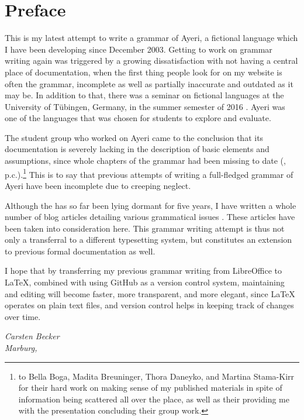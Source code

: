\chapter*{Preface}

This is my latest attempt to write a grammar of Ayeri, a fictional language 
which I have been developing since December 2003. Getting to work on grammar 
writing again was triggered by a growing dissatisfaction with not having a 
central place of documentation, when the first thing people look for on my 
website is often the grammar, incomplete as well as partially inaccurate and 
outdated as it may be. In addition to that, there was a seminar on fictional 
languages at the University of Tübingen, Germany, in the summer semester of 
2016 \autocite{buch2016ss}. Ayeri was one of the languages that was chosen for 
students to explore and evaluate.

The student group who worked on Ayeri came to the conclusion that its 
documentation is severely lacking in the description of basic elements and 
assumptions, since whole chapters of the grammar had been missing to date 
(\cite[12]{boga2016}, p.c.).\footnote{ to Bella Boga, Madita Breuninger, Thora Daneyko, and Martina Stama-Kirr for 
their hard work on making sense of my published materials in spite of 
information being scattered all over the place, as well as their providing me 
with the presentation concluding their group work.} This is to say that previous 
attempts of writing a full-fledged grammar of Ayeri have been incomplete due to 
creeping neglect.

Although the  has so far been lying dormant for five years, 
I have written a whole number of blog articles detailing various grammatical 
issues \autocite[Blog]{benung}. These articles have been taken into 
consideration here. This grammar writing attempt is thus not only a transferral 
to a different typesetting system, but constitutes an extension to previous 
formal documentation as well.

I hope that by transferring my previous grammar writing from LibreOffice to  
\LaTeX{}, combined with using GitHub as a version control system, maintaining 
and editing will become faster, more transparent, and more elegant, since 
\LaTeX{} operates on plain text files, and version control helps in keeping 
track of changes over time.

\begin{flushright}\itshape\footnotesize
Carsten Becker\\
Marburg, 
\end{flushright}